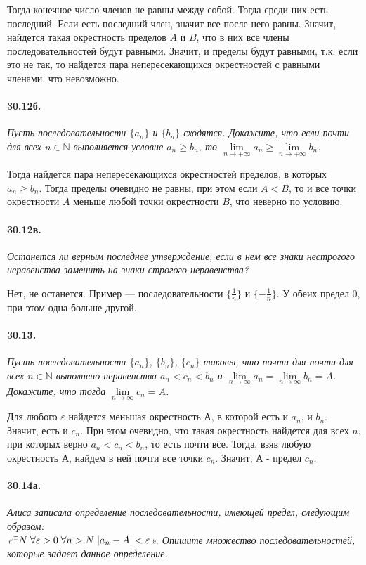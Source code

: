 \documentclass{book}
\begin{document}
Тогда конечное число членов не равны между собой. Тогда среди них есть последний. Если есть последний член, значит все после него равны. Значит, найдется такая окрестность пределов $A$ и $B$, что в них все члены последовательностей будут равными. Значит, и пределы будут равными, т.к. если это не так, то найдется пара непересекающихся окрестностей с равными членами, что невозможно.

\paragraph{30.12б.}
\textit{Пусть последовательности  $\{a_n\}$ и $\{b_n\}$ сходятся. Докажите, что если почти для всех $n \in \mathbb{N}$ выполняется условие $a_n \geq b_n$, то $\underset{n \to +\infty}{\lim} a_n \geq \underset{n \to +\infty}{\lim} b_n$.}

Тогда найдется пара непересекающихся окрестностей пределов, в которых $a_n \geq b_n$. Тогда пределы очевидно не равны, при этом если $A < B$, то и все точки окрестности $A$ меньше любой точки окрестности $B$, что неверно по условию.

\paragraph{30.12в.}
\textit{Останется ли верным последнее утверждение, если в нем все знаки нестрогого неравенства заменить на знаки строгого неравенства?}

Нет, не останется. Пример --- последовательности $\{\frac{1}{n}\}$ и $\{-\frac{1}{n}\}$. У обеих предел 0, при этом одна больше другой.

\paragraph{30.13.}
\textit{Пусть последовательности $\{a_n\}$,  $\{b_n\}$, $\{c_n\}$ таковы, что почти для почти для всех $n \in \mathbb{N}$ выполнено неравенства $a_n < c_n < b_n$ и $\underset{n \to \infty}{\lim} a_n = \underset{n \to \infty}{\lim} b_n  = A$. Докажите, что тогда $\underset{n \to \infty}{\lim} c_n  = A$.}

Для любого $\varepsilon$ найдется меньшая окрестность А, в которой есть и $a_n$, и $b_n$. Значит, есть и $c_n$. При этом очевидно, что такая окрестность найдется для всех $n$, при которых верно $a_n < c_n < b_n$, то есть почти все. Тогда, взяв любую окрестность А, найдем в ней почти все точки $c_n$. Значит, А - предел $c_n$.

\paragraph{30.14а.}
\textit{Алиса записала определение последовательности, имеющей предел, следующим образом: \\ «$\exists N \thickspace \forall \varepsilon > 0 \thickspace \forall n > N \thickspace |a_n - A| < \varepsilon$». Опишите множество последовательностей, которые задает данное определение.}
\end{document}

